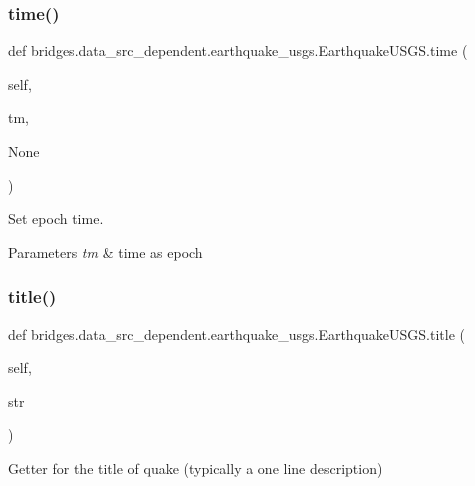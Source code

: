 \subsubsection{\texorpdfstring{time()}{time()}\hspace{0.1cm}{\footnotesize\ttfamily [2/2]}}
{\footnotesize\ttfamily def bridges.\+data\+\_\+src\+\_\+dependent.\+earthquake\+\_\+usgs.\+Earthquake\+U\+S\+G\+S.\+time (\begin{DoxyParamCaption}\item[{}]{self,  }\item[{}]{tm,  }\item[{}]{None }\end{DoxyParamCaption})}



Set epoch time. 


\begin{DoxyParams}{Parameters}
{\em tm} & time as epoch \\
\hline
\end{DoxyParams}
\mbox{\label{classbridges_1_1data__src__dependent_1_1earthquake__usgs_1_1_earthquake_u_s_g_s_a7b46d73e199b4cf4f9b1253f89727abe}} 
\subsubsection{\texorpdfstring{title()}{title()}\hspace{0.1cm}{\footnotesize\ttfamily [1/2]}}
{\footnotesize\ttfamily def bridges.\+data\+\_\+src\+\_\+dependent.\+earthquake\+\_\+usgs.\+Earthquake\+U\+S\+G\+S.\+title (\begin{DoxyParamCaption}\item[{}]{self,  }\item[{}]{str }\end{DoxyParamCaption})}



Getter for the title of quake (typically a one line description) 

